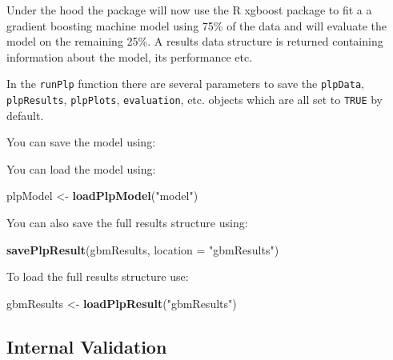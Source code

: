 \documentclass[11pt]{book}
\newenvironment{Shaded}{\begin{snugshade}}{\end{snugshade}}
\newcommand{\DataTypeTok}[1]{\textcolor[rgb]{0.13,0.29,0.53}{#1}}
\newcommand{\KeywordTok}[1]{\textcolor[rgb]{0.13,0.29,0.53}{\textbf{#1}}}
\newcommand{\NormalTok}[1]{#1}
\newcommand{\OperatorTok}[1]{\textcolor[rgb]{0.81,0.36,0.00}{\textbf{#1}}}
\newcommand{\StringTok}[1]{\textcolor[rgb]{0.31,0.60,0.02}{#1}}
\theoremstyle{definition}
\theoremstyle{definition}
\theoremstyle{definition}
\theoremstyle{remark}
\begin{document}
Under the hood the package will now use the R xgboost package to fit a a gradient boosting machine model using 75\% of the data and will evaluate the model on the remaining 25\%. A results data structure is returned containing information about the model, its performance etc.

In the \texttt{runPlp} function there are several parameters to save the \texttt{plpData}, \texttt{plpResults}, \texttt{plpPlots}, \texttt{evaluation}, etc. objects which are all set to \texttt{TRUE} by default.

You can save the model using:

\begin{Shaded}
\end{Shaded}

You can load the model using:

\begin{Shaded}
\begin{Highlighting}[]
\NormalTok{plpModel <-}\StringTok{ }\KeywordTok{loadPlpModel}\NormalTok{(}\StringTok{"model"}\NormalTok{)}
\end{Highlighting}
\end{Shaded}

You can also save the full results structure using:

\begin{Shaded}
\begin{Highlighting}[]
\KeywordTok{savePlpResult}\NormalTok{(gbmResults, }\DataTypeTok{location =} \StringTok{"gbmResults"}\NormalTok{)}
\end{Highlighting}
\end{Shaded}

To load the full results structure use:

\begin{Shaded}
\begin{Highlighting}[]
\NormalTok{gbmResults <-}\StringTok{ }\KeywordTok{loadPlpResult}\NormalTok{(}\StringTok{"gbmResults"}\NormalTok{)}
\end{Highlighting}
\end{Shaded}

\hypertarget{internal-validation}{%
\subsection{Internal Validation}\label{internal-validation}}
\end{document}
